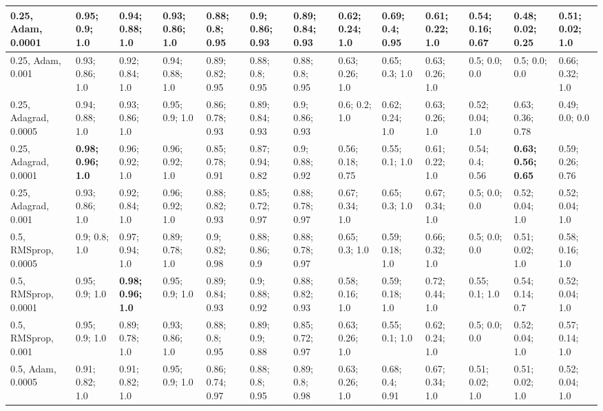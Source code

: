 \documentclass{VUMIFPSbakalaurinis}
\begin{document}
\begin{longtable}{ | p{1.5cm} | p{1cm} | p{1cm} | p{1cm} | p{1cm} | p{1cm} | p{1cm} | p{1cm} | p{1cm} | p{1cm} | p{1cm} | p{1cm} | p{1cm} | }
    0.25, Adam, 0.0001    & 0.95; 0.9; 1.0 & 0.94; 0.88; 1.0 & 0.93; 0.86; 1.0    &  0.88; 0.8; 0.95 & 0.9; 0.86; 0.93 & 0.89; 0.84; 0.93    &  0.62; 0.24; 1.0 & 0.69; 0.4; 0.95 & 0.61; 0.22; 1.0             &  0.54; 0.16; 0.67 & 0.48; 0.02; 0.25 & 0.51; 0.02; 1.0  \\ \hline
    0.25, Adam, 0.001     & 0.93; 0.86; 1.0 & 0.92; 0.84; 1.0 & 0.94; 0.88; 1.0   &  0.89; 0.82; 0.95 & 0.88; 0.8; 0.95 & 0.88; 0.8; 0.95    &  0.63; 0.26; 1.0 & 0.65; 0.3; 1.0 & 0.63; 0.26; 1.0              &  0.5; 0.0; 0.0 & 0.5; 0.0; 0.0 & 0.66; 0.32; 1.0  \\ \hline
    0.25, Adagrad, 0.0005 & 0.94; 0.88; 1.0 & 0.93; 0.86; 1.0 & 0.95; 0.9; 1.0    &  0.86; 0.78; 0.93 & 0.89; 0.84; 0.93 & 0.9; 0.86; 0.93   &  0.6; 0.2; 1.0 & 0.62; 0.24; 1.0 & 0.63; 0.26; 1.0               &  0.52; 0.04; 1.0 & 0.63; 0.36; 0.78 & 0.49; 0.0; 0.0  \\ \hline
    0.25, Adagrad, 0.0001 & \textbf{0.98; 0.96; 1.0} & 0.96; 0.92; 1.0 & 0.96; 0.92; 1.0   &  0.85; 0.78; 0.91 & 0.87; 0.94; 0.82 & 0.9; 0.88; 0.92   &  0.56; 0.18; 0.75 & 0.55; 0.1; 1.0 & 0.61; 0.22; 1.0    &  0.54; 0.4; 0.56 & \textbf{0.63; 0.56; 0.65} & 0.59; 0.26; 0.76  \\ \hline
    0.25, Adagrad, 0.001  & 0.93; 0.86; 1.0 & 0.92; 0.84; 1.0 & 0.96; 0.92; 1.0   &  0.88; 0.82; 0.93 & 0.85; 0.72; 0.97 & 0.88; 0.78; 0.97  &  0.67; 0.34; 1.0 & 0.65; 0.3; 1.0 & 0.67; 0.34; 1.0              &  0.5; 0.0; 0.0 & 0.52; 0.04; 1.0 & 0.52; 0.04; 1.0  \\ \hline
    0.5,  RMSprop, 0.0005  & 0.9; 0.8; 1.0 & 0.97; 0.94; 1.0 & 0.89; 0.78; 1.0     &  0.9; 0.82; 0.98 & 0.88; 0.86; 0.9 & 0.88; 0.78; 0.97   &  0.65; 0.3; 1.0 & 0.59; 0.18; 1.0 & 0.66; 0.32; 1.0              &  0.5; 0.0; 0.0 & 0.51; 0.02; 1.0 & 0.58; 0.16; 1.0  \\ \hline
    0.5,  RMSprop, 0.0001  & 0.95; 0.9; 1.0 & \textbf{0.98; 0.96; 1.0} & 0.95; 0.9; 1.0     &  0.89; 0.84; 0.93 & 0.9; 0.88; 0.92 & 0.88; 0.82; 0.93  &  0.58; 0.16; 1.0 & 0.59; 0.18; 1.0 & 0.72; 0.44; 1.0    &  0.55; 0.1; 1.0 & 0.54; 0.14; 0.7 & 0.52; 0.04; 1.0  \\ \hline
    0.5,  RMSprop, 0.001   & 0.95; 0.9; 1.0 & 0.89; 0.78; 1.0 & 0.93; 0.86; 1.0    &  0.88; 0.8; 0.95 & 0.89; 0.9; 0.88 & 0.85; 0.72; 0.97   &  0.63; 0.26; 1.0 & 0.55; 0.1; 1.0 & 0.62; 0.24; 1.0              &  0.5; 0.0; 0.0 & 0.52; 0.04; 1.0 & 0.57; 0.14; 1.0  \\ \hline
    0.5, Adam, 0.0005     & 0.91; 0.82; 1.0 & 0.91; 0.82; 1.0 & 0.95; 0.9; 1.0    &  0.86; 0.74; 0.97 & 0.88; 0.8; 0.95 & 0.89; 0.8; 0.98    &  0.63; 0.26; 1.0 & 0.68; 0.4; 0.91 & 0.67; 0.34; 1.0    &  0.51; 0.02; 1.0 & 0.51; 0.02; 1.0 & 0.52; 0.04; 1.0  \\ \hline

\end{longtable}
\end{document}
